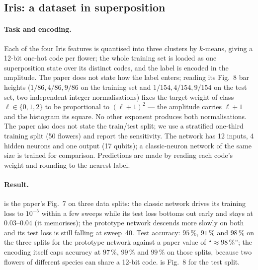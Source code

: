 \subsection{Iris: a dataset in superposition}
\label{sec:iris}

\paragraph{Task and encoding.}
Each of the four Iris features is quantised into three clusters by $k$-means, giving a 12-bit
one-hot code per flower; the whole training set is loaded as one superposition state over its
distinct codes, and the label is encoded in the amplitude.  The paper does not state how the
label enters; reading its Fig.~8 bar heights ($1/86, 4/86, 9/86$ on the training set and
$1/154, 4/154, 9/154$ on the test set, two independent integer normalisations) fixes the target
weight of class $\ell\in\{0,1,2\}$ to be proportional to $(\ell+1)^2$ --- the amplitude carries
$\ell+1$ and the histogram its square.  No other exponent produces both normalisations.  The
paper also does not state the train/test split; we use a stratified one-third training split
(50 flowers) and report the sensitivity.  The network has 12 inputs, 4 hidden neurons and one
output (17 qubits); a classic-neuron network of the same size is trained for comparison.
Predictions are made by reading each code's weight and rounding to the nearest label.

\paragraph{Result.}
 is the paper's Fig.~7 on three data splits: the classic network drives
its training loss to $10^{-5}$ within a few sweeps while its test loss bottoms out early and
stays at $0.03$--$0.04$ (it memorises); the prototype network descends more slowly on both and
its test loss is still falling at sweep~40.  Test accuracy: $95\,\%$, $91\,\%$ and $98\,\%$ on
the three splits for the prototype network against a paper value of ``$\approx 98\,\%$''; the
encoding itself caps accuracy at $97\,\%$, $99\,\%$ and $99\,\%$ on those splits, because two
flowers of different species can share a 12-bit code.   is Fig.~8 for the
test split.

